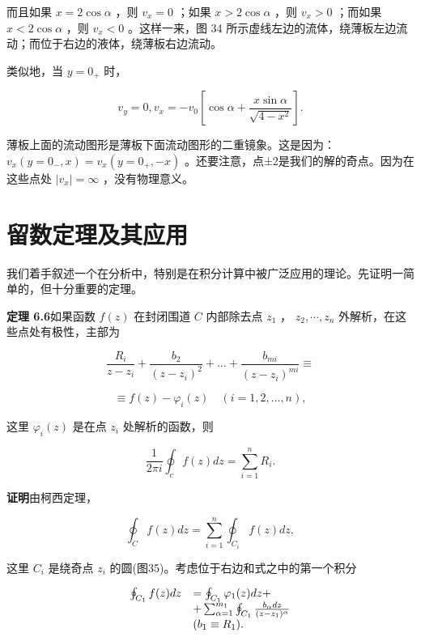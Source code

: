 而且如果 $x = 2 \cos \alpha$ ，则 $v_{x} = 0$ ；如果 $x > 2 \cos \alpha$ ，则 $v_{x} > 0$ ；而如果 $x < 2 \cos \alpha$ ，则 $v_{x} < 0$ 。这样一来，图 34 所示虚线左边的流体，绕薄板左边流动；而位于右边的液体，绕薄板右边流动。

类似地，当 $y = 0_{+}$ 时，

\begin{equation*}
v _ {y} = 0, v _ {x} = - v _ {0} \left[ \cos \alpha + \frac {x \sin \alpha}{\sqrt {4 - x ^ {2}}} \right].
\end{equation*}

薄板上面的流动图形是薄板下面流动图形的二重镜象。这是因为： $v_{x}(y=0_{-}, x)=v_{x}(y=0_{+}, -x)$ 。还要注意，点±2是我们的解的奇点。因为在这些点处 $|v_{x}|=\infty$ ，没有物理意义。

\section{留数定理及其应用}

我们着手叙述一个在分析中，特别是在积分计算中被广泛应用的理论。先证明一简单的，但十分重要的定理。

\textbf{定理 6.6}\quad 如果函数 $f(z)$ 在封闭围道 $C$ 内部除去点 $z_{1}$ ， $z_{2}, \cdots, z_{n}$ 外解析，在这些点处有极性，主部为

\begin{equation*}
\frac {R _ {i}}{z - z _ {i}} + \frac {b _ {2}}{(z - z _ {i}) ^ {2}} + \dots + \frac {b _ {m i}}{(z - z _ {i}) ^ {m i}} \equiv
\end{equation*}

\begin{equation*}
\equiv f (z) - \varphi_ {i} (z) \quad (i = 1, 2, \dots , n),
\end{equation*}

这里 $\varphi_{i}(z)$ 是在点 $z_{i}$ 处解析的函数，则

\begin{equation*}
\frac {1}{2 \pi i} \oint_ {c} f (z) d z = \sum_ {i = 1} ^ {n} R _ {i}.
\end{equation*}

\textbf{证明}\quad 由柯西定理，

\begin{equation*}
\oint_ {C} f (z) d z = \sum_ {i = 1} ^ {n} \oint_ {C _ {i}} f (z) d z,
\end{equation*}

这里 $C_i$ 是绕奇点 $z_i$ 的圆(图35)。考虑位于右边和式之中的第一个积分

\begin{equation*}
\begin{array}{r l} \oint_ {C _ {1}} f (z) d z & = \oint_ {C _ {1}} \varphi_ {1} (z) d z + \\ & + \sum_ {\alpha = 1} ^ {m _ {1}} \oint_ {C _ {1}} \frac {b _ {\alpha} d z}{(z - z _ {1}) ^ {\alpha}} \\ & (b _ {1} \equiv R _ {1}). \end{array}
\end{equation*}

